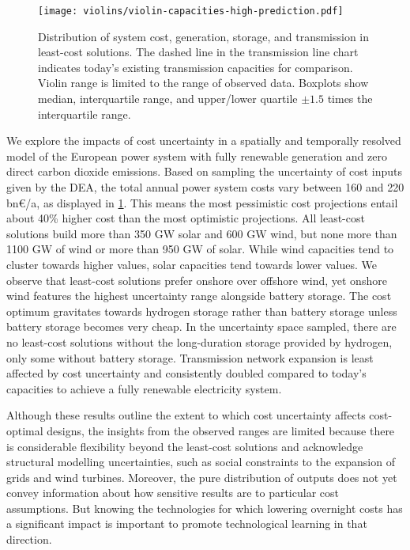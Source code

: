 
\begin{figure}
    \centering
    \texttt{[image: violins/violin-capacities-high-prediction.pdf]}
    \caption{
      Distribution of system cost, generation, storage, and transmission
      in least-cost solutions. The dashed line in the
      transmission line chart indicates today's existing transmission
      capacities for comparison. Violin range is limited to the range of observed data.
      Boxplots show median, interquartile range, and upper/lower quartile $\pm 1.5$ times the interquartile range.
    }
    \label{fig:violin}
\end{figure}

We explore the impacts of cost uncertainty in a spatially and temporally
resolved model of the European power system with fully renewable generation and
zero direct carbon dioxide emissions. Based on sampling the uncertainty of cost
inputs given by the DEA,\cite{DEA} the total annual power system costs vary
between 160 and 220 bn\euro/a, as displayed in \cref{fig:violin}. This means the
most pessimistic cost projections entail about 40\% higher cost than the most
optimistic projections. All least-cost solutions build more than 350 GW solar
and 600 GW wind, but none more than 1100 GW of wind or more than 950 GW of
solar. While wind capacities tend to cluster towards higher values, solar
capacities tend towards lower values. We observe that least-cost solutions
prefer onshore over offshore wind, yet onshore wind features the highest
uncertainty range alongside battery storage. The cost optimum gravitates towards
hydrogen storage rather than battery storage unless battery storage becomes very
cheap. In the uncertainty space sampled, there are no least-cost solutions
without the long-duration storage provided by hydrogen, only some without
battery storage. Transmission network expansion is least affected by cost
uncertainty and consistently doubled compared to today's capacities to achieve a
fully renewable electricity system.

Although these results outline the extent to which cost uncertainty affects
cost-optimal designs, the insights from the observed ranges are limited because
there is considerable flexibility beyond the least-cost solutions and acknowledge
structural modelling uncertainties, such as social constraints to the expansion
of grids and wind turbines. Moreover, the pure distribution of outputs does not
yet convey information about how sensitive results are to particular cost
assumptions. But knowing the technologies for which lowering overnight costs has
a significant impact is important to promote technological learning in that
direction.

